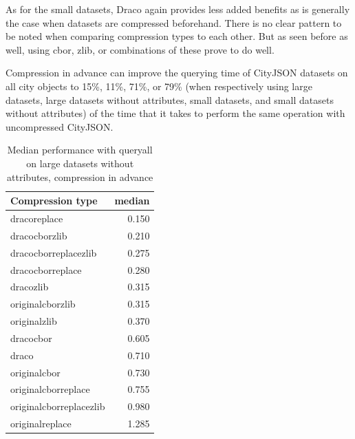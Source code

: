 As for the small datasets, Draco again provides less added benefits as is generally the case when datasets are compressed beforehand.
There is no clear pattern to be noted when comparing compression types to each other.
But as seen before as well, using cbor, zlib, or combinations of these prove to do well.

Compression in advance can improve the querying time of CityJSON datasets on all city objects to 15\%, 11\%, 71\%, or 79\% (when respectively using large datasets, large datasets without attributes, small datasets, and small datasets without attributes) of the time that it takes to perform the same operation with uncompressed CityJSON.



  \begin{table}[!h]
    \begin{minipage}{.5\linewidth}
      \caption{
Median performance with queryall on large datasets, compression in advance}
\centering

\begin{tabular}{|l|r|}
\hline
Compression type & median\\
\hline
dracoreplace & 0.150\\
\hline
dracocborzlib & 0.210\\
\hline
dracocborreplacezlib & 0.275\\
\hline
dracocborreplace & 0.280\\
\hline
dracozlib & 0.315\\
\hline
originalcborzlib & 0.315\\
\hline
originalzlib & 0.370\\
\hline
dracocbor & 0.605\\
\hline
draco & 0.710\\
\hline
originalcbor & 0.730\\
\hline
originalcborreplace & 0.755\\
\hline
originalcborreplacezlib & 0.980\\
\hline
originalreplace & 1.285\\
\hline
\end{tabular}
\end{minipage}%
    \begin{minipage}{.5\linewidth}
      \centering
        \caption{
Median performance with queryall on large datasets without attributes, compression in advance}


\end{minipage}
\end{table}
